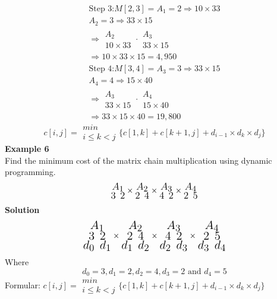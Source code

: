 \documentclass[12pt]{report}
\begin{document}
	\begin{align*}
		\text{Step 3:}
		M[2,3]=  A_1 = 2 \Rightarrow 10 \times 33\\
		A_2 = 3 \Rightarrow 33 \times 15\\
		\Rightarrow \substack{A_2\\10\times 33} \cdot \substack{A_3\\33 \times 15}\\
		\Rightarrow 10 \times 33 \times 15 = 4,950
	\end{align*}
	\begin{align*}
		\text{Step 4:}
		M[3,4]=  A_3 = 3 \Rightarrow 33 \times 15\\
		A_4 = 4 \Rightarrow 15 \times 40\\
		\Rightarrow \substack{A_3\\33 \times 15} \cdot \substack{A_4\\15 \times 40}\\
		\Rightarrow 33 \times 15 \times 40 = 19,800
	\end{align*}
	$$c[i,j] = \substack{min\\{i\le k < j}}\bigg\{ c[1,k] + c[k+1,j] + d_{i-1} \times d_k\times d_j\bigg\}$$
	\textbf{Example 6}\\
	Find the minimum cost of the matrix chain multiplication using dynamic programming.
	$$\LARGE\substack{A_1\\{3 ~2}}\times \substack{A_2\\ {2 ~4}} \times \substack{A_3\\ {4 ~2}}\times\substack{A_4\\ {2 ~5}}$$
	\textbf{Solution}\\
	\begin{align*}
		\huge\substack{A_1\\{3 ~2}\\{d_0 ~d_1}} \times \substack{A_2\\{2 ~4}\\ {d_1 ~d_2}} \times \substack{A_3\\{4 ~2}\\ {d_2 ~d_3}}\times \substack{A_4\\{2 ~5}\\{d_3 ~d_4}}
	\end{align*}
	Where
	$$d_0=3, d_1 = 2, d_2 = 4, d_3 = 2 \text{ and } d_4 = 5$$
	Formular: $c[i,j] = \substack{min\\{i\le k < j}}\bigg\{ c[1,k] + c[k+1,j] + d_{i-1} \times d_k\times d_j\bigg\}$
\end{document}
